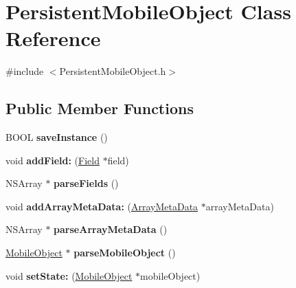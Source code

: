 \hypertarget{interface_persistent_mobile_object}{
\section{\-Persistent\-Mobile\-Object \-Class \-Reference}
\label{interface_persistent_mobile_object}
}


{\ttfamily \#include $<$\-Persistent\-Mobile\-Object.\-h$>$}

\subsection*{\-Public \-Member \-Functions}
\begin{DoxyCompactItemize}
\item 
\hypertarget{interface_persistent_mobile_object_a725c72be55d2f166c4e297c1932e83fe}{
\-B\-O\-O\-L {\bfseries save\-Instance} ()}
\label{interface_persistent_mobile_object_a725c72be55d2f166c4e297c1932e83fe}

\item 
\hypertarget{interface_persistent_mobile_object_a8364caa2eec8a3f23b4d0342ec669838}{
void {\bfseries add\-Field\-:} (\hyperlink{interface_field}{\-Field} $\ast$field)}
\label{interface_persistent_mobile_object_a8364caa2eec8a3f23b4d0342ec669838}

\item 
\hypertarget{interface_persistent_mobile_object_aea1bb63fa2ce9ef1b13d19a254cfa9a7}{
\-N\-S\-Array $\ast$ {\bfseries parse\-Fields} ()}
\label{interface_persistent_mobile_object_aea1bb63fa2ce9ef1b13d19a254cfa9a7}

\item 
\hypertarget{interface_persistent_mobile_object_af43783dcae0a163e816737123c1c454d}{
void {\bfseries add\-Array\-Meta\-Data\-:} (\hyperlink{interface_array_meta_data}{\-Array\-Meta\-Data} $\ast$array\-Meta\-Data)}
\label{interface_persistent_mobile_object_af43783dcae0a163e816737123c1c454d}

\item 
\hypertarget{interface_persistent_mobile_object_ad2b2551f4e477956e02fbaf8d9412946}{
\-N\-S\-Array $\ast$ {\bfseries parse\-Array\-Meta\-Data} ()}
\label{interface_persistent_mobile_object_ad2b2551f4e477956e02fbaf8d9412946}

\item 
\hypertarget{interface_persistent_mobile_object_a8116e82d5200e2d452d6a3cf7e06f2e2}{
\hyperlink{interface_mobile_object}{\-Mobile\-Object} $\ast$ {\bfseries parse\-Mobile\-Object} ()}
\label{interface_persistent_mobile_object_a8116e82d5200e2d452d6a3cf7e06f2e2}

\item 
\hypertarget{interface_persistent_mobile_object_a7ef49dc59ef03e4a259914cbc63844b2}{
void {\bfseries set\-State\-:} (\hyperlink{interface_mobile_object}{\-Mobile\-Object} $\ast$mobile\-Object)}
\label{interface_persistent_mobile_object_a7ef49dc59ef03e4a259914cbc63844b2}

\end{DoxyCompactItemize}

